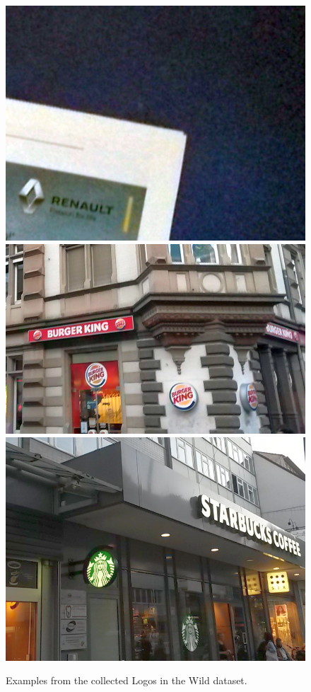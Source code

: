 \documentclass[a4paper,twoside]{article}
\newlength{\frameSize}
\begin{document}
\begin{figure}
\\
\vspace{1.5mm}%
\includegraphics[height=\frameSize]{img/sample15.png}
\hfill
\includegraphics[height=\frameSize]{img/sample5.png}
\hfill
\includegraphics[height=\frameSize]{img/sample9.png}
\caption{Examples from the collected Logos in the Wild dataset.}%
\label{fig:logoSamples}
\end{figure}%
\end{document}
